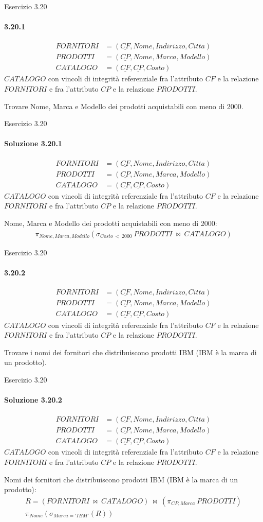 \def\schemaEx3.20{\small \begin{align*}
    FORNITORI &= (\underline{CF}, Nome, Indirizzo, Citta)\\
    PRODOTTI &= (\underline{CP}, Nome, Marca, Modello)\\
    CATALOGO &= (\underline{CF}, \underline{CP}, Costo)
    \end{align*}
    $CATALOGO$ con vincoli di integrit\`a referenziale fra l'attributo $CF$ e la relazione $FORNITORI$ e fra l'attributo $CP$ e la relazione $PRODOTTI$.}
\begin{frame}{Esercizio 3.20}
    \framesubtitle{3.20.1}
    \vspace{-3.cm}
    \schemaEx3.20
    \vspace{.3cm}

    Trovare Nome, Marca e Modello dei prodotti acquistabili con meno di 2000.
\end{frame}
%
\begin{frame}{Esercizio 3.20}
    \framesubtitle{Soluzione 3.20.1}
    \vspace*{-2cm}
    \schemaEx3.20
    \vspace{.3cm}

    {\small Nome, Marca e Modello dei prodotti acquistabili con meno di 2000:}
    \small
    \begin{gather*}
        \pi_{Nome,Marca,Modello} (\sigma_{Costo~<~2000}~PRODOTTI~\bowtie~CATALOGO)
    \end{gather*}
\end{frame}
%
\begin{frame}{Esercizio 3.20}
    \framesubtitle{3.20.2}
    \vspace{-3.cm}
    \schemaEx3.20
    \vspace{.3cm}

    Trovare i nomi dei fornitori che distribuiscono prodotti IBM (IBM \`e la marca di un prodotto).
\end{frame}
%
\begin{frame}{Esercizio 3.20}
    \framesubtitle{Soluzione 3.20.2}
    \vspace*{-2cm}
    \schemaEx3.20
    \vspace{.3cm}

    {\small Nomi dei fornitori che distribuiscono prodotti IBM (IBM \`e la marca di un prodotto):}
    \small
    \begin{gather*}
        R = (FORNITORI~\bowtie~CATALOGO)~\bowtie~(\pi_{CP,Marca}~PRODOTTI)\\
        \pi_{Nome} (\sigma_{Marca='IBM'} (R))
    \end{gather*}
\end{frame}
